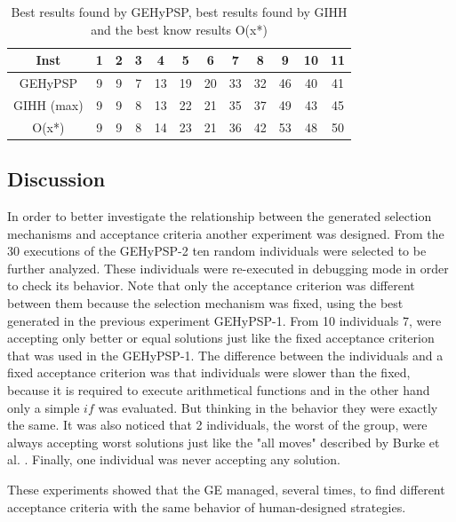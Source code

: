 \documentclass[conference]{IEEEtran}
\begin{document}
\begin{table}[]
	\centering
	\caption{Best results found by GEHyPSP, best results found by GIHH and the best know results O(x*)}
	\label{tab:gihhandbhlh}
	\begin{tabular}{cccccccccccc}
		Inst         & 1 & 2 & 3 & 4  & 5  & 6  & 7  & 8  & 9  & 10 & 11 \\ \hline
		GEHyPSP  & 9 & 9 & 7 & 13 & 19 & 20 & 33 & 32 & 46 & 40 & 41 \\ \hline
		GIHH (max)   & 9 & 9 & 8 & 13 & 22 & 21 & 35 & 37 & 49 & 43 & 45 \\ \hline
		O(x*)        & 9 & 9 & 8 & 14 & 23 & 21 & 36 & 42 & 53 & 48 & 50
	\end{tabular}
\end{table}


\subsection{Discussion}

In order to better investigate the relationship between the generated selection mechanisms and acceptance criteria another experiment was designed. From the 30 executions of the GEHyPSP-2 ten random individuals were selected to be further analyzed. These individuals were re-executed in debugging mode in order to check its behavior. Note that only the acceptance criterion was different between them because the selection mechanism was fixed, using the best generated in the previous experiment GEHyPSP-1. From 10 individuals 7, were accepting only better or equal solutions just like the fixed acceptance criterion that was used in the GEHyPSP-1. The difference between the individuals and a fixed acceptance criterion was that individuals were slower than the fixed, because it is required to execute arithmetical functions and in the other hand only a simple $if$ was evaluated. But thinking in the behavior they were exactly the same. It was also noticed that 2 individuals, the worst of the group, were always accepting worst solutions just like the "all moves" described by Burke et al. \cite{burke2013hyper}. Finally, one individual was never accepting any solution. 

These experiments showed that the GE managed, several times, to find different acceptance criteria with the same behavior of human-designed strategies. 





%
%
%
\end{document}
